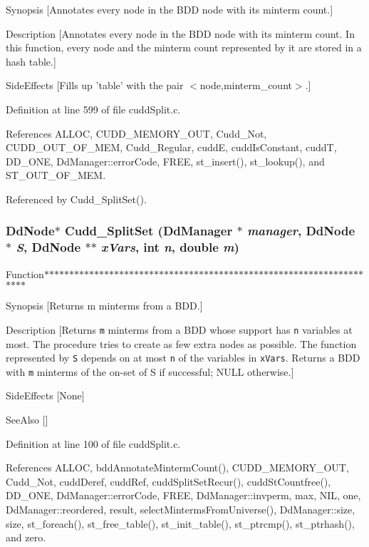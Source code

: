 Synopsis [Annotates every node in the BDD node with its minterm count.]

Description [Annotates every node in the BDD node with its minterm count. In this function, every node and the minterm count represented by it are stored in a hash table.]

Side\-Effects [Fills up 'table' with the pair $<$node,minterm\_\-count$>$.] 

Definition at line 599 of file cudd\-Split.c.

References ALLOC, CUDD\_\-MEMORY\_\-OUT, Cudd\_\-Not, CUDD\_\-OUT\_\-OF\_\-MEM, Cudd\_\-Regular, cudd\-E, cudd\-Is\-Constant, cudd\-T, DD\_\-ONE, Dd\-Manager::error\-Code, FREE, st\_\-insert(), st\_\-lookup(), and ST\_\-OUT\_\-OF\_\-MEM.

Referenced by Cudd\_\-Split\-Set().
\subsubsection{\setlength{\rightskip}{0pt plus 5cm}\bf{Dd\-Node}$\ast$ Cudd\_\-Split\-Set (\bf{Dd\-Manager} $\ast$ {\em manager}, \bf{Dd\-Node} $\ast$ {\em S}, \bf{Dd\-Node} $\ast$$\ast$ {\em x\-Vars}, int {\em n}, double {\em m})}\label{cuddSplit_8c_5386715b96f5d263045e0ee11703ee7c}


Function$\ast$$\ast$$\ast$$\ast$$\ast$$\ast$$\ast$$\ast$$\ast$$\ast$$\ast$$\ast$$\ast$$\ast$$\ast$$\ast$$\ast$$\ast$$\ast$$\ast$$\ast$$\ast$$\ast$$\ast$$\ast$$\ast$$\ast$$\ast$$\ast$$\ast$$\ast$$\ast$$\ast$$\ast$$\ast$$\ast$$\ast$$\ast$$\ast$$\ast$$\ast$$\ast$$\ast$$\ast$$\ast$$\ast$$\ast$$\ast$$\ast$$\ast$$\ast$$\ast$$\ast$$\ast$$\ast$$\ast$$\ast$$\ast$$\ast$$\ast$$\ast$$\ast$$\ast$$\ast$$\ast$$\ast$$\ast$$\ast$

Synopsis [Returns m minterms from a BDD.]

Description [Returns {\tt m} minterms from a BDD whose support has {\tt n} variables at most. The procedure tries to create as few extra nodes as possible. The function represented by {\tt S} depends on at most {\tt n} of the variables in {\tt x\-Vars}. Returns a BDD with {\tt m} minterms of the on-set of S if successful; NULL otherwise.]

Side\-Effects [None]

See\-Also [] 

Definition at line 100 of file cudd\-Split.c.

References ALLOC, bdd\-Annotate\-Minterm\-Count(), CUDD\_\-MEMORY\_\-OUT, Cudd\_\-Not, cudd\-Deref, cudd\-Ref, cudd\-Split\-Set\-Recur(), cudd\-St\-Countfree(), DD\_\-ONE, Dd\-Manager::error\-Code, FREE, Dd\-Manager::invperm, max, NIL, one, Dd\-Manager::reordered, result, select\-Minterms\-From\-Universe(), Dd\-Manager::size, size, st\_\-foreach(), st\_\-free\_\-table(), st\_\-init\_\-table(), st\_\-ptrcmp(), st\_\-ptrhash(), and zero.
